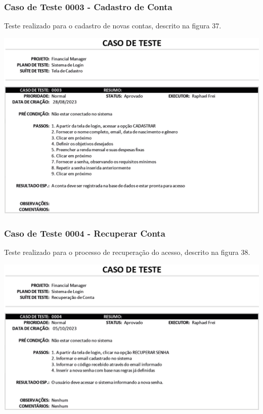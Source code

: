 \subsubsection{Caso de Teste 0003 - Cadastro de Conta}

Teste realizado para o cadastro de novas contas, descrito na figura 37.

    \begin{center}
        \begin{minipage}{\textwidth}
            \centering
            \includegraphics[scale=0.8]{figs/caso-testes-0003.png}
            \label{fig:figura37}
        \end{minipage}
    \end{center} 

\subsubsection{Caso de Teste 0004 - Recuperar Conta}

Teste realizado para o processo de recuperação do acesso, descrito na figura 38.

    \begin{center}
        \begin{minipage}{\textwidth}
            \centering
            \includegraphics[scale=0.75]{figs/caso-testes-0004.png}
            \label{fig:figura38}
        \end{minipage}
    \end{center} 
    
